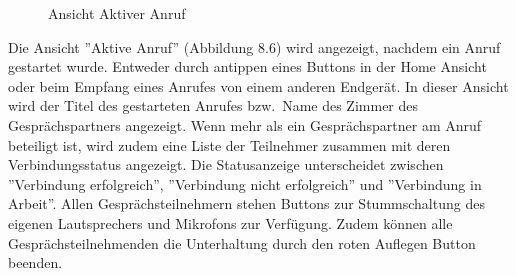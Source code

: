 \begin{figure}[h]
\begin{minipage}[b]{0.45\textwidth}
        \caption{Ansicht Aktiver Anruf}
    \end{minipage}
    \label{fig:MobileClient-Screens3}
\end{figure}

Die Ansicht ''Aktive Anruf'' (Abbildung 8.6) wird angezeigt, nachdem ein Anruf gestartet wurde.
Entweder durch antippen eines Buttons in der Home Ansicht oder beim Empfang eines Anrufes von einem anderen Endgerät.
In dieser Ansicht wird der Titel des gestarteten Anrufes bzw.\ Name des Zimmer des Gesprächspartners angezeigt.
Wenn mehr als ein Gesprächspartner am Anruf beteiligt ist, wird zudem eine Liste der Teilnehmer zusammen mit deren Verbindungsstatus angezeigt.
Die Statusanzeige unterscheidet zwischen ''Verbindung erfolgreich'', ''Verbindung nicht erfolgreich'' und ''Verbindung in Arbeit''.
Allen Gesprächsteilnehmern stehen Buttons zur Stummschaltung des eigenen Lautsprechers und Mikrofons zur Verfügung.
Zudem können alle Gesprächsteilnehmenden die Unterhaltung durch den roten Auflegen Button beenden.


